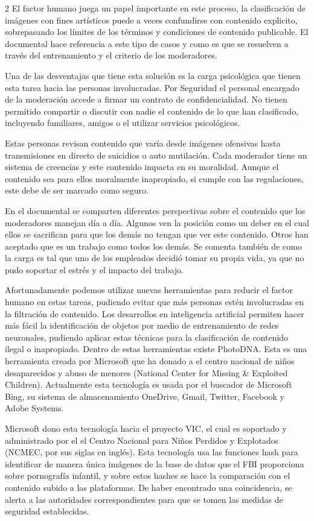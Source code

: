 \documentclass[12pt,spanish,Letterpaper,openany]{book}
\begin{document}
\begin {multicols}{2}
El factor humano juega un papel importante en este proceso, la clasificación de imágenes con fines artísticos puede a veces confundirse con contenido explicito, sobrepasando los límites de los términos y condiciones de contenido publicable. El documental hace referencia a este tipo de casos y como es que se resuelven a través del entrenamiento y el criterio de los moderadores.

Una de las desventajas que tiene esta solución es la carga psicológica que tienen esta tarea hacia las personas involucradas. Por Seguridad el personal encargado de la moderación accede a firmar un contrato de confidencialidad. No tienen permitido compartir o discutir con nadie el contenido de lo que han clasificado, incluyendo familiares, amigos o el utilizar servicios psicológicos.

Estas personas revisan contenido que varía desde imágenes ofensivas hasta transmisiones en directo de suicidios o auto mutilación. Cada moderador tiene un sistema de creencias y este contenido impacta en su moralidad. Aunque el contenido sea para ellos moralmente inapropiado, si cumple con las regulaciones, este debe de ser marcado como seguro.

En el documental se comparten diferentes perspectivas sobre el contenido que los moderadores manejan día a día. Algunos ven la posición como un deber en el cual ellos se sacrifican para que los demás no tengan que ver este contenido. Otros han aceptado que es un trabajo como todos los demás. Se comenta también de como la carga es tal que uno de los empleados decidió tomar su propia vida, ya que no pudo soportar el estrés y el impacto del trabajo.

Afortunadamente podemos utilizar nuevas herramientas para reducir el factor humano en estas tareas, pudiendo evitar que más personas estén involucradas en la filtración de contenido. Los desarrollos en inteligencia artificial permiten hacer más fácil la identificación de objetos por medio de entrenamiento de redes neuronales, pudiendo aplicar estas técnicas para la clasificación de contenido ilegal o inapropiado. Dentro de estas herramientas existe PhotoDNA. Esta es una herramienta creada por Microsoft que ha donado a el centro nacional de niños desaparecidos y abuso de menores (National Center for Missing \& Exploited Children). Actualmente esta tecnología es usada por el buscador de Microsoft Bing, su sistema de almacenamiento OneDrive, Gmail, Twitter, Facebook y Adobe Systems.

Microsoft dono esta tecnología hacia el proyecto VIC, el cual es soportado y administrado por el el Centro Nacional para Niños Perdidos y Explotados (NCMEC, por sus siglas en inglés). Esta tecnología usa las funciones hash para identificar de manera única imágenes de la base de datos que el FBI proporciona sobre pornografía infantil, y sobre estos hashes se hace la comparación con el contenido subido a las plataformas. De haber encontrado una coincidencia, se alerta a las autoridades correspondientes para que se tomen las medidas de seguridad establecidas.


\end{multicols}
\end{document}
